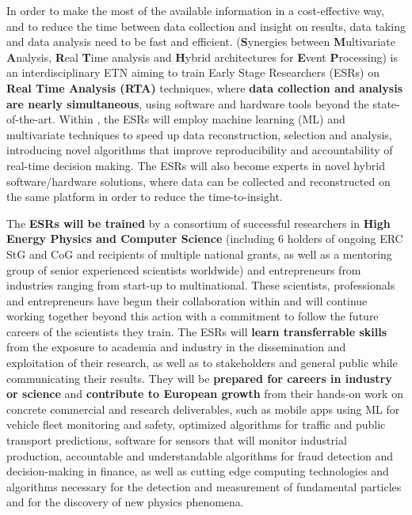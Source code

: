 In order to make the most of the available information in a cost-effective way, and to reduce the time between data collection and  insight on results, data taking and data analysis need to be fast and efficient. 
\acronym ({\color{blue}\textbf{S}}ynergies between {\color{blue}\textbf{M}}ultivariate {\color{blue}\textbf{A}}nalysis, {\color{blue}\textbf{R}}eal {\color{blue}\textbf{T}}ime analysis and {\color{blue}\textbf{H}}ybrid architectures for {\color{blue}\textbf{E}}vent {\color{blue}\textbf{P}}rocessing) is an interdisciplinary ETN aiming to train Early Stage Researchers (ESRs) on \textbf{Real Time Analysis (RTA)} techniques, where \textbf{data collection and analysis are nearly simultaneous}, using software and hardware tools beyond the state-of-the-art. 
Within \acronym, the ESRs will employ machine learning (ML) and multivariate techniques to speed up data reconstruction, selection and analysis, introducing novel algorithms that improve reproducibility and accountability of real-time decision making. 
The ESRs will also become experts in novel hybrid software/hardware solutions, where data can be collected and reconstructed on the same platform in order to reduce the time-to-insight.

The \acronym \textbf{ESRs will be trained} by a consortium of successful researchers in \textbf{High Energy Physics and Computer Science} (including 6 holders of ongoing ERC StG and CoG and recipients of multiple national grants, as well as a mentoring group of senior experienced scientists worldwide) and entrepreneurs from industries ranging from start-up to multinational. 
These scientists, professionals and entrepreneurs have begun their collaboration within \acronym and will continue working together beyond this action with a commitment to follow the future careers of the scientists they train. 
The ESRs will \textbf{learn transferrable skills} from the exposure to academia and industry in the dissemination and exploitation of their research, as well as to stakeholders and general public while communicating their results. 
They will be \textbf{prepared for careers in industry or science} and \textbf{contribute to European growth} from their hands-on work on concrete commercial and research deliverables, such as 
mobile apps using ML for vehicle fleet monitoring and safety, 
optimized algorithms for traffic and public transport predictions,
software for sensors that will monitor industrial production, 
accountable and understandable algorithms for fraud detection and decision-making in finance,
as well as cutting edge computing technologies and algorithms necessary for the detection and measurement of fundamental particles and for the discovery of new physics phenomena. 
